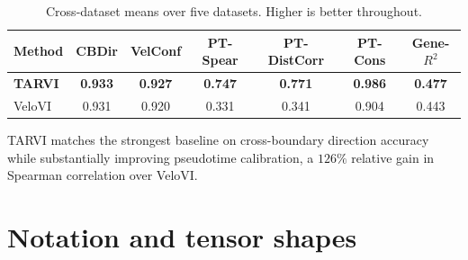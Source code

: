 \documentclass[11pt,a4paper]{article}
\theoremstyle{definition}
\begin{document}
\begin{table}[h]
\centering
\caption{Cross-dataset means over five datasets. Higher is better throughout.}
\begin{tabular}{@{}lcccccc@{}}
\toprule
\textbf{Method} & CBDir & VelConf & PT-Spear & PT-DistCorr & PT-Cons & Gene-$R^2$ \\
\midrule
\textbf{TARVI} & \textbf{0.933} & \textbf{0.927} & \textbf{0.747} & \textbf{0.771} & \textbf{0.986} & \textbf{0.477} \\
VeloVI         & 0.931 & 0.920 & 0.331 & 0.341 & 0.904 & 0.443 \\
\bottomrule
\end{tabular}
\end{table}

TARVI matches the strongest baseline on cross-boundary direction accuracy while
substantially improving pseudotime calibration, a $126\%$ relative gain in
Spearman correlation over VeloVI.

\appendix
\section{Notation and tensor shapes}
\label{app:notation}
\end{document}
